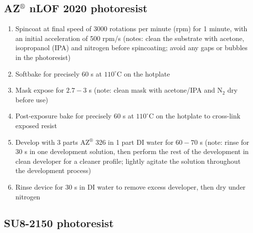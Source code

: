 \documentclass[
  a4paper,
]{scrbook}
\begin{document}
\hypertarget{azcircledr-nlof-2020-photoresist}{%
\subsection{\texorpdfstring{AZ\(^\circledR\) nLOF 2020
photoresist}{AZ\^{}\textbackslash circledR nLOF 2020 photoresist}}\label{azcircledr-nlof-2020-photoresist}}

\begin{enumerate}
\def\labelenumi{\arabic{enumi}.}
\item
  Spincoat at final speed of 3000 rotations per minute (rpm) for 1
  minute, with an initial acceleration of 500 rpm/s (notes: clean the
  substrate with acetone, isopropanol (IPA) and nitrogen before
  spincoating; avoid any gaps or bubbles in the photoresist)
\item
  Softbake for precisely 60 s at \(110^\circ\)C on the hotplate
\item
  Mask expose for \(2.7-3\) s (note: clean mask with acetone/IPA and
  N\(_2\) dry before use)
\item
  Post-exposure bake for precisely 60 s at \(110^\circ\)C on the
  hotplate to cross-link exposed resist
\item
  Develop with 3 parts AZ\(^\circledR\) 326 in 1 part DI water for
  \(60-70\) s (note: rinse for 30 s in one development solution, then
  perform the rest of the development in clean developer for a cleaner
  profile; lightly agitate the solution throughout the development
  process)
\item
  Rinse device for 30 s in DI water to remove excess developer, then dry
  under nitrogen
\end{enumerate}

\hypertarget{su8-2150-photoresist}{%
\subsection{SU8-2150 photoresist}\label{su8-2150-photoresist}}
\end{document}
